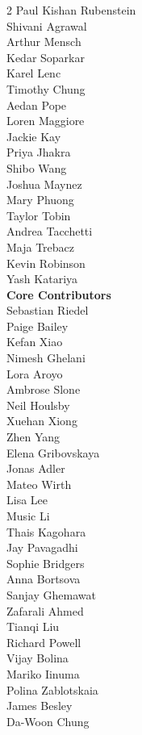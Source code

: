 \begin{multicols}{2}
Paul Kishan Rubenstein \\
Shivani Agrawal \\
Arthur Mensch \\
Kedar Soparkar \\
Karel Lenc \\
Timothy Chung \\
Aedan Pope \\
Loren Maggiore \\
Jackie Kay \\
Priya Jhakra \\
Shibo Wang \\
Joshua Maynez \\
Mary Phuong \\
Taylor Tobin \\
Andrea Tacchetti \\
Maja Trebacz \\
Kevin Robinson \\
Yash Katariya \\
\noindent
\textbf{Core Contributors} \\
Sebastian Riedel \\
Paige Bailey \\
Kefan Xiao \\
Nimesh Ghelani \\
Lora Aroyo \\
Ambrose Slone \\
Neil Houlsby \\
Xuehan Xiong \\
Zhen Yang \\
Elena Gribovskaya \\
Jonas Adler \\
Mateo Wirth \\
Lisa Lee \\
Music Li \\
Thais Kagohara \\
Jay Pavagadhi \\
Sophie Bridgers \\
Anna Bortsova \\
Sanjay Ghemawat \\
Zafarali Ahmed \\
Tianqi Liu \\
Richard Powell \\
Vijay Bolina \\
Mariko Iinuma \\
Polina Zablotskaia \\
James Besley \\
Da-Woon Chung \\

\end{multicols}
